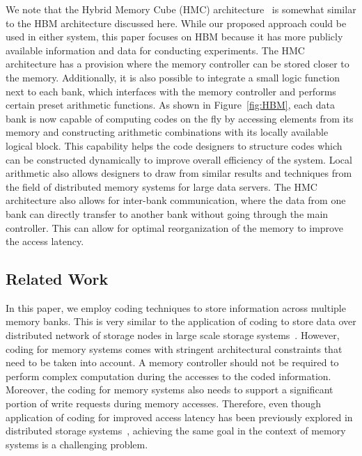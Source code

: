 \begin{remark}
We note that the Hybrid Memory Cube (HMC) architecture~\cite{HMC_slides} is somewhat similar to the HBM architecture discussed here. While our proposed approach could be used in either system, this paper focuses on HBM because it has more publicly available information and data for conducting experiments. The HMC architecture has a provision where the memory controller can be stored closer to the memory. Additionally, it is also possible to integrate a small logic function next to each bank, which interfaces with the memory controller and performs certain preset arithmetic functions. As shown in Figure~\ref{fig:HBM}, each data bank is now capable of computing codes on the fly by accessing elements from its memory and constructing arithmetic combinations with its locally available logical block. This capability helps the code designers to structure codes which can be constructed dynamically to improve overall efficiency of the system. Local arithmetic also allows designers to draw from similar results and techniques from the field of distributed memory systems for large data servers. The HMC architecture also allows for inter-bank communication, where the data from one bank can directly transfer to another bank without going through the main controller. This can allow for optimal reorganization of the memory to improve the access latency. 
\end{remark}

\newpage

%
\subsection{Related Work}
\label{sec:related}

In this paper, we employ coding techniques to store information across multiple memory banks. This is very similar to the application of coding to store data over distributed network of storage nodes in large scale storage systems~\cite{khan, dimakis, Azure12, sathiamoorthy, Hitchhiker}. However, coding for memory systems comes with stringent architectural constraints that need to be taken into account. A memory controller should not be required to perform complex computation during the accesses to the coded information. Moreover, the coding for memory systems also needs to support a significant portion of write requests during memory accesses. Therefore, even though application of coding for improved access latency has been previously explored in distributed storage systems~\cite{batchcodes, RPDV16, RSDG16, WKCB17}, achieving the same goal in the context of memory systems is a challenging problem. 

